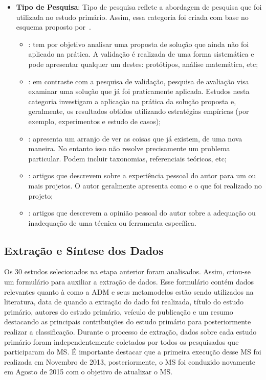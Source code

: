 \begin{itemize}
        \item \textbf{Tipo de Pesquisa}: Tipo de pesquisa reflete a abordagem de pesquisa que foi utilizada no estudo primário. Assim, essa categoria foi criada com base no esquema proposto por~.
        
        \begin{itemize}
            \item {}: tem por objetivo analisar uma proposta de solução que ainda não foi aplicado na prática. A validação é realizada de uma forma sistemática e pode apresentar qualquer um destes: protótipos, análise matemática, etc;
            \item {}: em contraste com a pesquisa de validação, pesquisa de avaliação visa examinar uma solução que já foi praticamente aplicada. Estudos nesta categoria investigam a aplicação na prática da solução proposta e, geralmente, os resultados obtidos utilizando estratégias empíricas (por exemplo, experimentos e estudo de casos);
            \item {}: apresenta um arranjo de ver as coisas que já existem, de uma nova maneira. No entanto isso não resolve precisamente um problema particular. Podem incluir taxonomias, referenciais teóricos, etc;
            \item {}: artigos que descrevem sobre a experiência pessoal do autor para um ou mais projetos. O autor geralmente apresenta como e o que foi realizado no projeto;
            \item {}: artigos que descrevem a opinião pessoal do autor sobre a adequação ou inadequação de uma técnica ou ferramenta específica.
        \end{itemize}
    
\end{itemize}


\subsection{Extração e Síntese dos Dados}\label{subsec:extracao_e_sintese_do_dados}

Os 30 estudos selecionados na etapa anterior foram analisados. Assim, criou-se um formulário para auxiliar a extração de dados. Esse formulário contém dados relevantes quanto à como a ADM e seus metamodelos estão sendo utilizados na literatura, data de quando a extração do dado foi realizada, título do estudo primário, autores do estudo primário, veículo de publicação e um resumo destacando as principais contribuições do estudo primário para posteriormente realizar a classificação. Durante o processo de extração, dados sobre cada estudo primário foram independentemente coletados por todos os pesquisados que participaram do MS. É importante destacar que a primeira execução desse MS foi realizada em Novembro de 2013, posteriormente, o MS foi conduzido novamente em Agosto de 2015 com o objetivo de atualizar o MS.

